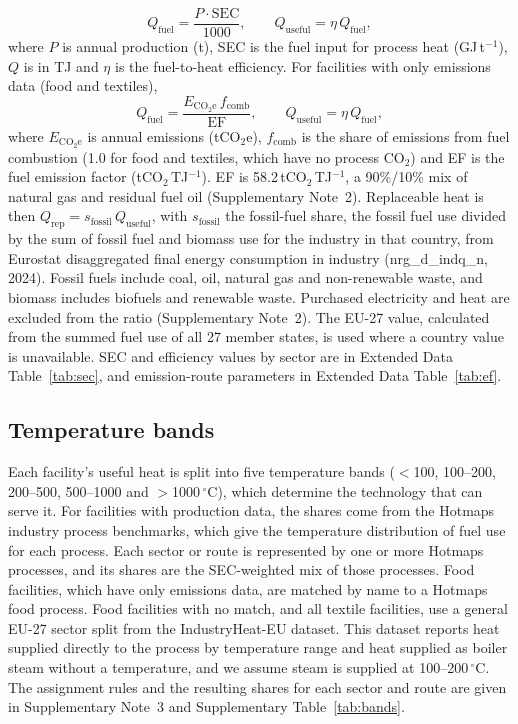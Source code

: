 \documentclass[11pt]{article}
\begin{document}
\begin{equation}
Q_{\mathrm{fuel}} = \frac{P \cdot \mathrm{SEC}}{1000}, \qquad Q_{\mathrm{useful}} = \eta\, Q_{\mathrm{fuel}},
\end{equation}
where $P$ is annual production (t), SEC is the fuel input for process heat (GJ\,t$^{-1}$), $Q$ is in TJ and $\eta$ is the fuel-to-heat efficiency. For facilities with only emissions data (food and textiles),
\begin{equation}
Q_{\mathrm{fuel}} = \frac{E_{\mathrm{CO_2e}}\, f_{\mathrm{comb}}}{\mathrm{EF}}, \qquad Q_{\mathrm{useful}} = \eta\, Q_{\mathrm{fuel}},
\end{equation}
where $E_{\mathrm{CO_2e}}$ is annual emissions (tCO$_2$e), $f_{\mathrm{comb}}$ is the share of emissions from fuel combustion (1.0 for food and textiles, which have no process CO$_2$) and EF is the fuel emission factor (tCO$_2$\,TJ$^{-1}$). EF is 58.2\,tCO$_2$\,TJ$^{-1}$, a 90\%/10\% mix of natural gas and residual fuel oil (Supplementary Note~2). Replaceable heat is then $Q_{\mathrm{rep}} = s_{\mathrm{fossil}}\, Q_{\mathrm{useful}}$, with $s_{\mathrm{fossil}}$ the fossil-fuel share, the fossil fuel use divided by the sum of fossil fuel and biomass use for the industry in that country, from Eurostat disaggregated final energy consumption in industry (nrg\_d\_indq\_n, 2024)\cite{eurostat_nrg_d_indq_n}. Fossil fuels include coal, oil, natural gas and non-renewable waste, and biomass includes biofuels and renewable waste. Purchased electricity and heat are excluded from the ratio (Supplementary Note~2). The EU-27 value, calculated from the summed fuel use of all 27 member states, is used where a country value is unavailable. SEC and efficiency values by sector are in Extended Data Table~\ref{tab:sec}, and emission-route parameters in Extended Data Table~\ref{tab:ef}.

\subsection*{Temperature bands}
Each facility's useful heat is split into five temperature bands ($<$100, 100--200, 200--500, 500--1000 and $>$1000\,$^\circ$C), which determine the technology that can serve it. For facilities with production data, the shares come from the Hotmaps industry process benchmarks\cite{hotmaps2018}, which give the temperature distribution of fuel use for each process. Each sector or route is represented by one or more Hotmaps processes, and its shares are the SEC-weighted mix of those processes. Food facilities, which have only emissions data, are matched by name to a Hotmaps food process. Food facilities with no match, and all textile facilities, use a general EU-27 sector split from the IndustryHeat-EU dataset\cite{industryheateu2025}. This dataset reports heat supplied directly to the process by temperature range and heat supplied as boiler steam without a temperature, and we assume steam is supplied at 100--200\,$^\circ$C. The assignment rules and the resulting shares for each sector and route are given in Supplementary Note~3 and Supplementary Table~\ref{tab:bands}.
\end{document}
